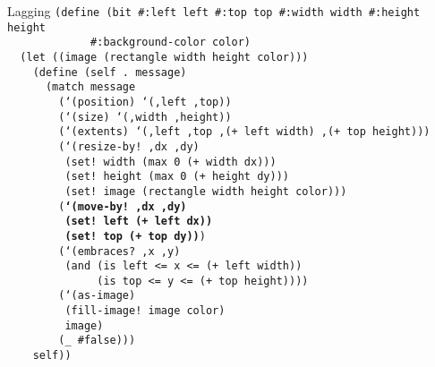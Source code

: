 \begin{frame}{Lagging}
  \tiny
  \texttt{(define (bit \#:left left \#:top top \#:width width \#:height height\\
    \ \ \ \ \ \ \ \ \ \ \ \ \ \#:background-color color)\\
    \ \ (let ((image (rectangle width height color)))\\
    \ \ \ \ (define (self .\ message)\\
    \ \ \ \ \ \ (match message\\
    \ \ \ \ \ \ \ \ (`(position) `(,left ,top))\\
    \ \ \ \ \ \ \ \ (`(size) `(,width ,height))\\
    \ \ \ \ \ \ \ \ (`(extents) `(,left ,top ,(+ left width) ,(+ top height)))\\
    \ \ \ \ \ \ \ \ (`(resize-by!\ ,dx ,dy)\\
    \ \ \ \ \ \ \ \ \ (set!\ width (max 0 (+ width dx)))\\
    \ \ \ \ \ \ \ \ \ (set!\ height (max 0 (+ height dy)))\\
    \ \ \ \ \ \ \ \ \ (set!\ image (rectangle width height color)))\\
    \ \ \ \ \ \ \ \ (\textbf{`(move-by!\ ,dx ,dy)\\
    \ \ \ \ \ \ \ \ \ (set!\ left (+ left dx))\\
    \ \ \ \ \ \ \ \ \ (set!\ top (+ top dy))})\\
    \ \ \ \ \ \ \ \ (`(embraces?\ ,x ,y)\\
    \ \ \ \ \ \ \ \ \ (and (is left <= x <= (+ left width))\\
    \ \ \ \ \ \ \ \ \ \ \ \ \ \ (is top <= y <= (+ top height))))\\
    \ \ \ \ \ \ \ \ (`(as-image)\\
    \ \ \ \ \ \ \ \ \ (fill-image!\ image color)\\
    \ \ \ \ \ \ \ \ \ image)\\
    \ \ \ \ \ \ \ \ (\_ \#false)))\\
    \ \ \ \ self))
  }
\end{frame}


